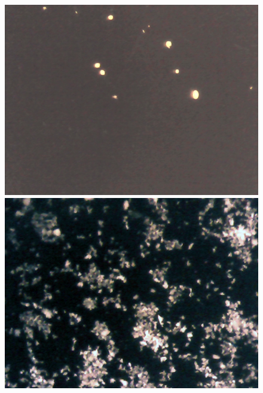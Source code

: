 \begin{figure}[H] \centering
\begin{minipage}[b]{0.3\textwidth} \centering
\includegraphics[width=1.00\textwidth]{billeder/software/1.jpg} %
\end{minipage} \hfill
\begin{minipage}[b]{0.3\textwidth} \centering
\includegraphics[width=1.00\textwidth]{billeder/software/2.jpg} %
\end{minipage} 
\hfill
\begin{minipage}[b]{0.3\textwidth} \centering

\end{minipage}
\end{figure}
